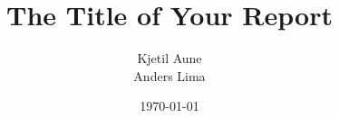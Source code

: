 \newcommand{\mytitle}{The Title of Your Report}
\newcommand{\mygroupnumber}{29}
\newcommand{\myauthor}{Kjetil Aune\\Anders Lima}

\title{\mytitle}
\author{\myauthor}
\date{\today}
